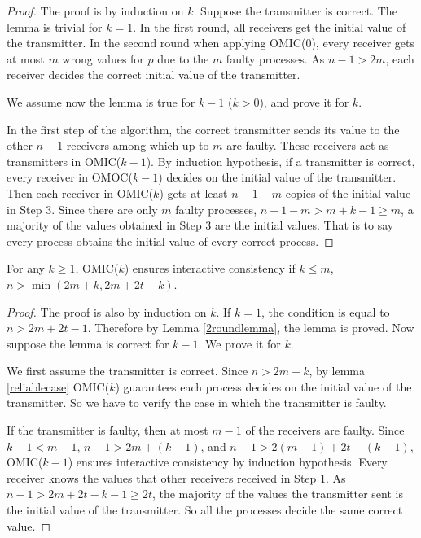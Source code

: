 \begin{proof}
  The proof is by induction on $k$. Suppose the transmitter is correct. The
  lemma is trivial for $k=1$.
In the first round, all receivers get the initial value of the transmitter. In the second
  round when applying OMIC($0$), every receiver gets at most $m$ wrong
  values for $p$ due to the $m$ faulty processes.
 As $n-1>2m$, each
  receiver decides the correct initial value of the transmitter.

  We assume now the
  lemma is true for $k-1$ ($k>0$), and prove it for $k$.
  
 

  In the first step of the algorithm, the correct transmitter sends its value
  to the other $n-1$ receivers among which up to $m$ are faulty. 
  These receivers act as transmitters in OMIC($k-1$). 
  By induction hypothesis, if a transmitter is correct, every receiver in OMOC($k-1$)
  decides on the initial value of the transmitter.
  Then each receiver in OMIC($k$)  gets at least $n-1-m$ copies of the
  initial value in Step $3$. Since there are only $m$ faulty processes,
  $n-1-m>m+k-1 \geqslant m$, a majority of the values obtained  in Step $3$
  are the initial values. That is to say every process obtains the initial
  value of every correct process.
\end{proof}

\begin{lemma}
  \label{mainlemma}For any $k \geqslant 1$, OMIC($k$) ensures
  interactive consistency if $k \leqslant m$, $n>\min(2m+k,2m+2t-k)$.
\end{lemma}

\begin{proof}
  The proof is also by induction on $k$. If $k=1$, the condition is equal to $n>2m+2t-1$.
  Therefore by Lemma \ref{2roundlemma}, the lemma is proved.
  Now suppose
  the lemma is correct for $k-1$. We prove it for $k$.
  
  We first assume the transmitter is correct. Since $n>2m+k$, by lemma
  \ref{reliablecase} OMIC($k$) guarantees each process decides on  the initial
  value of the transmitter. So we have to verify the case in which
  the transmitter is faulty.
  
  If the transmitter is faulty, then at most $m-1$ of the receivers are
  faulty. Since $k-1<m-1$, $n-1>2m+ ( k-1 )$, and $n-1>2 ( m-1 ) +2t- (
  k-1 )$, OMIC($k-1$) ensures interactive consistency by induction hypothesis.
  Every receiver  knows the values that other receivers received in Step 1. As
  $n-1>2m+2t-k-1 \geqslant 2t$, the majority of the values the transmitter
  sent is the initial value of the transmitter. So all the processes decide
  the same correct value.
\end{proof}



